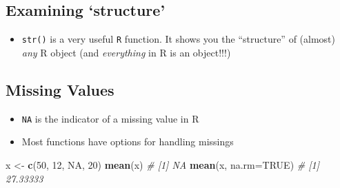 \documentclass[]{article}
\newenvironment{Shaded}{\begin{snugshade}}{\end{snugshade}}
\newcommand{\CommentTok}[1]{\textcolor[rgb]{0.56,0.35,0.01}{\textit{#1}}}
\newcommand{\DataTypeTok}[1]{\textcolor[rgb]{0.13,0.29,0.53}{#1}}
\newcommand{\DecValTok}[1]{\textcolor[rgb]{0.00,0.00,0.81}{#1}}
\newcommand{\KeywordTok}[1]{\textcolor[rgb]{0.13,0.29,0.53}{\textbf{#1}}}
\newcommand{\NormalTok}[1]{#1}
\newcommand{\OperatorTok}[1]{\textcolor[rgb]{0.81,0.36,0.00}{\textbf{#1}}}
\newcommand{\OtherTok}[1]{\textcolor[rgb]{0.56,0.35,0.01}{#1}}
\newcommand{\StringTok}[1]{\textcolor[rgb]{0.31,0.60,0.02}{#1}}
\providecommand{\tightlist}{%
  \setlength{\itemsep}{0pt}\setlength{\parskip}{0pt}}
\begin{document}
\begin{Shaded}
\end{Shaded}

\hypertarget{examining-structure}{%
\subsection{Examining `structure'}\label{examining-structure}}

\begin{itemize}
\tightlist
\item
  \texttt{str()} is a very useful \texttt{R} function. It shows you the
  ``structure'' of (almost) \emph{any} R object (and \emph{everything}
  in R is an object!!!)
\end{itemize}

\begin{Shaded}
\end{Shaded}

\hypertarget{missing-values}{%
\subsection{Missing Values}\label{missing-values}}

\begin{itemize}
\tightlist
\item
  \texttt{NA} is the indicator of a missing value in R
\item
  Most functions have options for handling missings
\end{itemize}

\begin{Shaded}
\begin{Highlighting}[]
\NormalTok{x <-}\StringTok{ }\KeywordTok{c}\NormalTok{(}\DecValTok{50}\NormalTok{, }\DecValTok{12}\NormalTok{, }\OtherTok{NA}\NormalTok{, }\DecValTok{20}\NormalTok{)}
\KeywordTok{mean}\NormalTok{(x)}
\CommentTok{# [1] NA}
\KeywordTok{mean}\NormalTok{(x, }\DataTypeTok{na.rm=}\OtherTok{TRUE}\NormalTok{)}
\CommentTok{# [1] 27.33333}
\end{Highlighting}
\end{Shaded}
\end{document}
